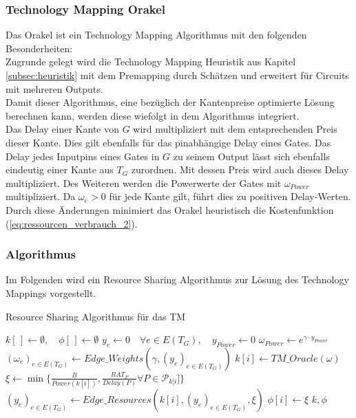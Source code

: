 \documentclass[11pt, a4paper, german]{article}
\newcommand{\TM}{Technology  Mapping }
\begin{document}
\subsubsection{\TM Orakel}
Das Orakel ist ein \TM Algorithmus mit den folgenden Besonderheiten: \\

Zugrunde gelegt wird die \TM Heuristik aus Kapitel \ref{subsec:heuristik} mit dem Premapping durch Schätzen und erweitert für Circuits mit mehreren Outputs. \\
Damit dieser Algorithmus, eine bezüglich der Kantenpreise optimierte Lösung berechnen kann, werden diese wiefolgt in dem Algorithmus integriert. \\
Das Delay einer Kante von $G$ wird multipliziert mit dem entsprechenden Preis dieser Kante. Dies gilt ebenfalls für das pinabhängige Delay eines Gates. Das Delay jedes Inputpins eines Gates in $G$ zu seinem Output lässt sich ebenfalls eindeutig einer Kante aus $T_G$ zurordnen. Mit dessen Preis wird auch dieses Delay multipliziert. Des Weiteren werden die Powerwerte der Gates mit $\omega_{Power}$ multipliziert. Da $\omega_e >0$ für jede Kante gilt, führt dies zu positiven Delay-Werten. \\
Durch diese Änderungen minimiert das Orakel heuristisch die Kostenfunktion (\ref{eq:ressourcen_verbrauch_2}).


\subsubsection{Algorithmus}
Im Folgenden wird ein Resource Sharing Algorithmus zur Lösung des Technology Mappings vorgestellt. \\

\LinesNumbered
\begin{algorithm}[H]
\DontPrintSemicolon
\caption{Resource Sharing Algorithmus für das TM}

   $k[\,] \gets \emptyset, \quad \phi[\,] \gets \emptyset $\;
  $y_e \gets 0 \quad \forall e \in E(T_G), \quad y_{Power} \gets 0$\;
     {
        $\omega_{Power} \gets e^{\gamma \cdot y_{Power}}$\;
        $(\omega_e)_{e \in E(T_G)} \gets Edge\_Weights(\gamma, (y_e)_{e \in E(T_G)})$\;
        $k[i] \gets TM\_Oracle(\omega)$\;
        $\xi \gets \min \{ \frac{B}{Power(k[i])}, \frac{RAT_P}{Delay(P)} \forall P \in \mathcal{P}_{k[i}] \}$\;
        $(y_e)_{e \in E(T_G)} \gets Edge\_Resources(k[i], (y_e)_{e \in E(T_G)}, \xi)$\;
        $\phi[i] \gets \xi$
     }
     \Return $k,\phi$
\end{algorithm}\ \\
\end{document}
